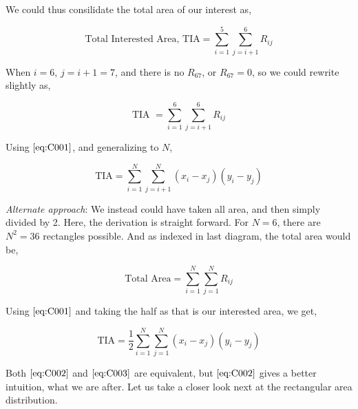 \documentclass[float=false,crop=false]{standalone}
\begin{document}
We could thus consilidate the total area of our interest as,

\[
\text{Total Interested Area, TIA} = \sum\limits_{i=1}^5\sum\limits_{j=i+1}^{6}R_{ij}
\]

When \(i=6\), \(j=i+1=7\), and there is no \(R_{67}\), or
\(R_{67} = 0\), so we could rewrite slightly as,

\[
\text{TIA } = \sum\limits_{i=1}^6\sum\limits_{j=i+1}^{6}R_{ij}
\]

    Using \(\ref{eq:C001}\), and generalizing to \(N\),

\begin{equation}
    \text{TIA} = \sum\limits_{i=1}^N\sum\limits_{j=i+1}^{N}(x_i - x_j)(y_i - y_j) \label{eq:C002}
\end{equation}

    \emph{Alternate approach}: We instead could have taken all area, and
then simply divided by 2. Here, the derivation is straight forward. For
\(N=6\), there are \(N^2=36\) rectangles possible. And as indexed in
last diagram, the total area would be,

\[
\text{Total Area} = \sum\limits_{i=1}^N\sum\limits_{j=1}^NR_{ij}
\]

Using \(\ref{eq:C001}\) and taking the half as that is our interested
area, we get,

    \begin{equation}
\text{TIA} = \dfrac{1}{2}\sum\limits_{i=1}^N\sum\limits_{j=1}^{N}(x_i - x_j)(y_i - y_j) \label{eq:C003}
\end{equation}

    Both \(\ref{eq:C002}\) and \(\ref{eq:C003}\) are equivalent, but
\(\ref{eq:C002}\) gives a better intuition, what we are after. Let us
take a closer look next at the rectangular area distribution.


    
    
    
    
\end{document}
